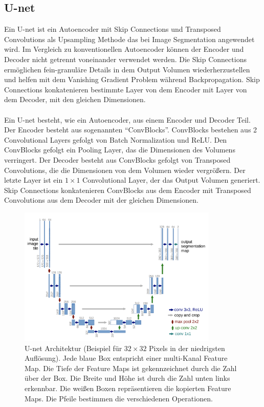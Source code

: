 \subsection{U-net}\label{section:u-net}
Ein U-net ist ein Autoencoder mit Skip Connections und Transposed Convolutions als Upsampling Methode das bei Image Segmentation angewendet wird.
Im Vergleich zu konventionellen Autoencoder können der Encoder und Decoder nicht getrennt voneinander verwendet werden. Die Skip Connections
ermöglichen fein-granuläre Details in dem Output Volumen wiederherzustellen und helfen mit dem Vanishing Gradient Problem während Backpropagation. 
Skip Connections konkatenieren bestimmte Layer von dem Encoder mit Layer von dem Decoder, mit den gleichen Dimensionen.
\\
\\
Ein U-net besteht, wie ein Autoencoder, aus einem Encoder und Decoder Teil. Der Encoder besteht aus sogenannten ``ConvBlocks''. ConvBlocks
bestehen aus 2 Convolutional Layers gefolgt von Batch Normalization und ReLU. Den ConvBlocks gefolgt
ein Pooling Layer, das die Dimensionen des Volumens verringert. Der Decoder besteht aus ConvBlocks gefolgt von Transposed Convolutions,
die die Dimensionen von dem Volumen wieder vergrößern. Der letzte Layer ist ein $1 \times 1$ Convolutional Layer, der das Output Volumen generiert.
Skip Connections konkatenieren ConvBlocks aus dem Encoder mit Transposed Convolutions aus dem Decoder mit der gleichen Dimensionen.

\begin{figure}[H]
  \centering
  \includegraphics[width=0.85\textwidth]{resources/networks/unet.png}
  \caption{
    U-net Architektur (Beispiel für $32 \times 32$ Pixels in der niedrigsten Auflösung). Jede blaue Box entspricht einer multi-Kanal Feature Map.
    Die Tiefe der Feature Maps ist gekennzeichnet durch die Zahl über der Box. Die Breite und Höhe ist durch die Zahl unten links erkennbar.
    Die weißen Boxen repräsentieren die kopierten Feature Maps. Die Pfeile bestimmen die verschiedenen Operationen.
    \cite{ronneberger2015unet}
  }
  \label{image:unet}
\end{figure}

